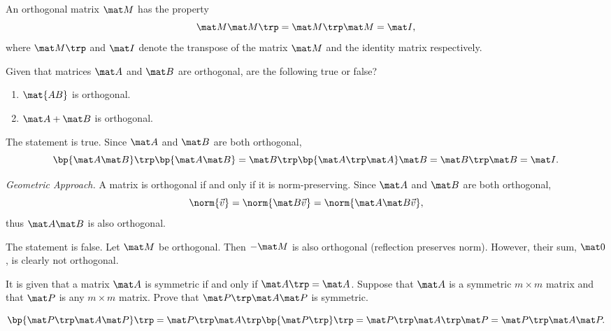 \begin{problem}
    An orthogonal matrix $\mat M$ has the property \[\mat M \mat M \trp = \mat M \trp \mat M = \mat I,\] where $\mat M \trp$ and $\mat I$ denote the transpose of the matrix $\mat M$ and the identity matrix respectively.

    Given that matrices $\mat A$ and $\mat B$ are orthogonal, are the following true or false?
    \begin{enumerate}
        \item $\mat{AB}$ is orthogonal.
        \item $\mat A + \mat B$ is orthogonal.
    \end{enumerate}
\end{problem}
\begin{solution}
    \begin{ppart}
        The statement is true. Since $\mat A$ and $\mat B$ are both orthogonal, \[\bp{\mat A \mat B}\trp \bp{\mat A \mat B} = \mat B\trp \bp{\mat A \trp \mat A} \mat B = \mat B \trp \mat B = \mat I.\]

        \noindent\textit{Geometric Approach.} A matrix is orthogonal if and only if it is norm-preserving. Since $\mat A$ and $\mat B$ are both orthogonal, \[\norm{\vec v} = \norm{\mat B \vec v} = \norm{\mat A \mat B \vec v},\] thus $\mat A \mat B$ is also orthogonal.
    \end{ppart}
    \begin{ppart}
        The statement is false. Let $\mat M$ be orthogonal. Then $-\mat M$ is also orthogonal (reflection preserves norm). However, their sum, $\mat 0$, is clearly not orthogonal.
    \end{ppart}
\end{solution}

\begin{problem}
    It is given that a matrix $\mat A$ is symmetric if and only if $\mat A \trp = \mat A$. Suppose that $\mat A$ is a symmetric $m \times m$ matrix and that $\mat P$ is any $m \times m$ matrix. Prove that $\mat P \trp \mat A \mat P$ is symmetric.
\end{problem}
\begin{solution}
    \[\bp{\mat P \trp \mat A \mat P}\trp = \mat P \trp \mat A \trp \bp{\mat P \trp}\trp = \mat P \trp \mat A \trp \mat P = \mat P \trp \mat A \mat P.\]
\end{solution}

